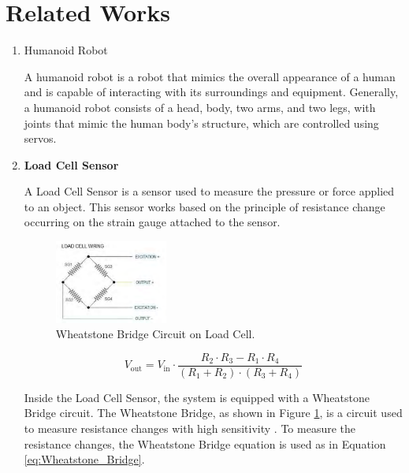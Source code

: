 \section{Related Works}
\label{sec:relatedworks}

\begin{enumerate}[label=\Alph*.]
    \item Humanoid Robot
    \label{subsec:robothumanoid}

    \hspace*{1em} A humanoid robot is a robot that mimics the overall appearance of a human and is capable of interacting with its surroundings and equipment. Generally, a humanoid robot consists of a head, body, two arms, and two legs, with joints that mimic the human body's structure, which are controlled using servos.

    \item \textbf{Load Cell Sensor}
    \label{subsec:sensorloadcell}

    \hspace*{1em} A Load Cell Sensor is a sensor used to measure the pressure or force applied to an object. This sensor works based on the principle of resistance change occurring on the strain gauge attached to the sensor.

    \begin{figure}[h]
        \centering
        \includegraphics[width=0.35\textwidth]{./gambar/wheatstone_loadcell.png}
        \caption{Wheatstone Bridge Circuit on Load Cell\cite{rahman2018autonomous}.}
        \label{fig:Wheatstone_Bridge}
    \end{figure}
    
    \begin{equation}
      V_{\mathrm{out}} = V_{\mathrm{in}} \cdot \frac{R_2 \cdot R_3 - R_1 \cdot R_4}{(R_1 + R_2) \cdot (R_3 + R_4)}
      \label{eq:Wheatstone_Bridge}
    \end{equation}
    
    \hspace*{1em} Inside the Load Cell Sensor, the system is equipped with a Wheatstone Bridge circuit. The Wheatstone Bridge, as shown in Figure \ref{fig:Wheatstone_Bridge}, is a circuit used to measure resistance changes with high sensitivity \cite{rahman2018autonomous}. To measure the resistance changes, the Wheatstone Bridge equation is used as in Equation \ref{eq:Wheatstone_Bridge}. 


\end{enumerate}
